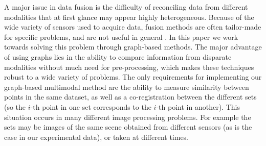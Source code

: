 \documentclass[journal]{IEEEtran}
\begin{document}

A major issue in data fusion is the difficulty of reconciling data from
different modalities that at first glance may appear highly
heterogeneous. Because of the wide variety of sensors used to acquire data,
fusion methods are often tailor-made for specific problems, and are not useful
in general \cite{lahat:hal-01062366}. In this paper we work towards solving this
problem through graph-based methods. The major advantage of using graphs lies in
the ability to compare information from disparate modalities without much need
for pre-processing, which makes these techniques robust to a wide variety of
problems.  The only requirements for implementing our graph-based multimodal
method are the ability to measure similarity between points in the same dataset,
as well as a co-registration between the different sets (so the $i$-th point in
one set corresponds to the $i$-th point in another). This situation occurs in many
different image processing problems. For example the sets may be images of
the same scene obtained from different sensors (as is the case in our
experimental data), or taken at different times.
\end{document}
